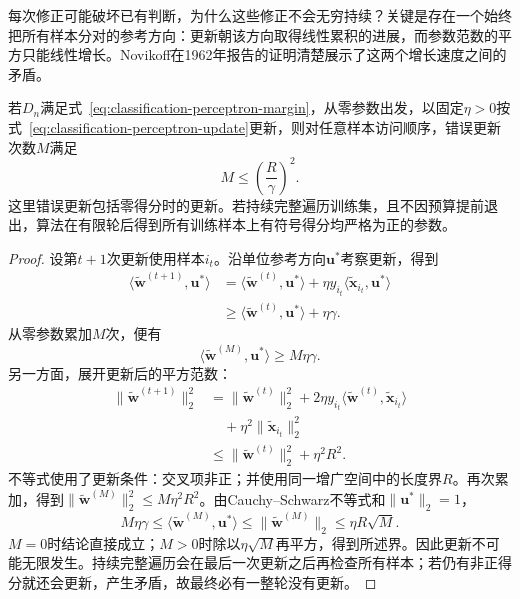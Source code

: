 每次修正可能破坏已有判断，为什么这些修正不会无穷持续？关键是存在一个始终把所有样本分对的参考方向：更新朝该方向取得线性累积的进展，而参数范数的平方只能线性增长。Novikoff在1962年报告的证明清楚展示了这两个增长速度之间的矛盾。

\begin{theorem}[感知机在有界可分样本下的最大更新次数]
  \label{thm:classification-perceptron-mistakes}
  若$D_n$满足式~\eqref{eq:classification-perceptron-margin}，从零参数出发，以固定$\eta>0$按式~\eqref{eq:classification-perceptron-update}更新，则对任意样本访问顺序，错误更新次数$M$满足
  \[
    M\leq\left(\frac R\gamma\right)^2 .
  \]
  这里错误更新包括零得分时的更新。若持续完整遍历训练集，且不因预算提前退出，算法在有限轮后得到所有训练样本上有符号得分均严格为正的参数。
\end{theorem}

\begin{proof}
  设第$t+1$次更新使用样本$i_t$。沿单位参考方向$\bm{u}^\ast$考察更新，得到
  \begin{align*}
    \langle\tilde{\bm{w}}^{(t+1)},\bm{u}^\ast\rangle
      &=\langle\tilde{\bm{w}}^{(t)},\bm{u}^\ast\rangle
        +\eta y_{i_t}\langle\tilde{\bm{x}}_{i_t},\bm{u}^\ast\rangle\\
      &\geq\langle\tilde{\bm{w}}^{(t)},\bm{u}^\ast\rangle+\eta\gamma .
  \end{align*}
  从零参数累加$M$次，便有
  \[
    \langle\tilde{\bm{w}}^{(M)},\bm{u}^\ast\rangle
      \geq M\eta\gamma .
  \]
  另一方面，展开更新后的平方范数：
  \begin{align*}
    \|\tilde{\bm{w}}^{(t+1)}\|_2^2
      &=\|\tilde{\bm{w}}^{(t)}\|_2^2
        +2\eta y_{i_t}
          \langle\tilde{\bm{w}}^{(t)},\tilde{\bm{x}}_{i_t}\rangle\\
      &\quad+\eta^2\|\tilde{\bm{x}}_{i_t}\|_2^2\\
      &\leq\|\tilde{\bm{w}}^{(t)}\|_2^2+\eta^2R^2 .
  \end{align*}
  不等式使用了更新条件：交叉项非正；并使用同一增广空间中的长度界$R$。再次累加，得到$\|\tilde{\bm{w}}^{(M)}\|_2^2\leq M\eta^2R^2$。由Cauchy--Schwarz不等式和$\|\bm{u}^\ast\|_2=1$，
  \[
    M\eta\gamma
      \leq\langle\tilde{\bm{w}}^{(M)},\bm{u}^\ast\rangle
      \leq\|\tilde{\bm{w}}^{(M)}\|_2
      \leq\eta R\sqrt{M}.
  \]
  $M=0$时结论直接成立；$M>0$时除以$\eta\sqrt M$再平方，得到所述界。因此更新不可能无限发生。持续完整遍历会在最后一次更新之后再检查所有样本；若仍有非正得分就还会更新，产生矛盾，故最终必有一整轮没有更新。
\end{proof}

